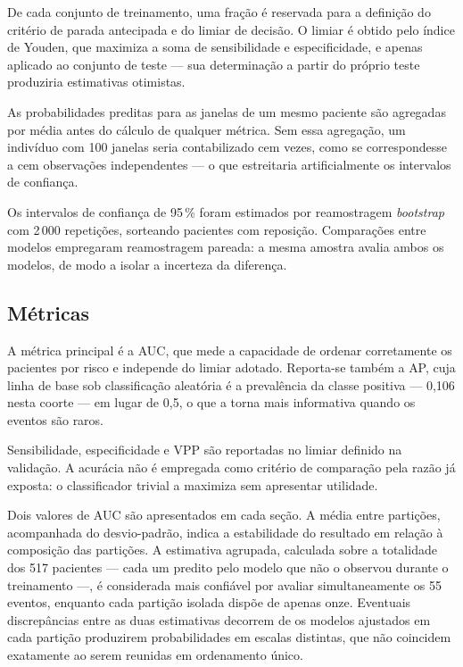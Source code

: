 De cada conjunto de treinamento, uma fração é reservada para a definição do
critério de parada antecipada e do limiar de decisão. O limiar é obtido pelo
índice de Youden, que maximiza a soma de sensibilidade e especificidade, e
apenas aplicado ao conjunto de teste --- sua determinação a partir do próprio
teste produziria estimativas otimistas.

As probabilidades preditas para as janelas de um mesmo paciente são
agregadas por média antes do cálculo de qualquer métrica. Sem essa agregação,
um indivíduo com 100 janelas seria contabilizado cem vezes, como se
correspondesse a cem observações independentes --- o que estreitaria
artificialmente os intervalos de confiança.

Os intervalos de confiança de 95\,\% foram estimados por reamostragem
\textit{bootstrap} com 2\,000 repetições, sorteando pacientes com reposição.
Comparações entre modelos empregaram reamostragem pareada: a mesma amostra
avalia ambos os modelos, de modo a isolar a incerteza da diferença.

\subsection{Métricas}
\label{subsec:config-metricas}

A métrica principal é a \gls{AUC}, que mede a capacidade de ordenar
corretamente os pacientes por risco e independe do limiar adotado. Reporta-se
também a \gls{AP}, cuja linha de base sob classificação aleatória é a
prevalência da classe positiva --- 0,106 nesta coorte --- em lugar de 0,5, o
que a torna mais informativa quando os eventos são raros.

Sensibilidade, especificidade e \gls{VPP} são reportadas no limiar definido
na validação. A acurácia não é empregada como critério de comparação pela
razão já exposta: o classificador trivial a maximiza sem apresentar
utilidade.

Dois valores de \gls{AUC} são apresentados em cada seção. A média entre
partições, acompanhada do desvio-padrão, indica a estabilidade do resultado
em relação à composição das partições. A estimativa agrupada, calculada sobre
a totalidade dos 517 pacientes --- cada um predito pelo modelo que não o
observou durante o treinamento ---, é considerada mais confiável por avaliar
simultaneamente os 55 eventos, enquanto cada partição isolada dispõe de
apenas onze. Eventuais discrepâncias entre as duas estimativas decorrem de os
modelos ajustados em cada partição produzirem probabilidades em escalas
distintas, que não coincidem exatamente ao serem reunidas em ordenamento
único.

